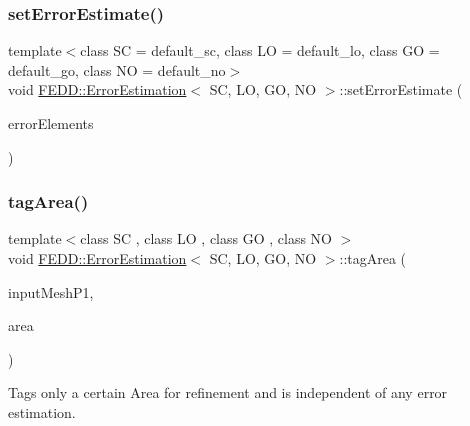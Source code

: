 \subsubsection{\texorpdfstring{set\+Error\+Estimate()}{setErrorEstimate()}}
{\footnotesize\ttfamily template$<$class SC = default\+\_\+sc, class LO = default\+\_\+lo, class GO = default\+\_\+go, class NO = default\+\_\+no$>$ \\
void \hyperlink{classFEDD_1_1ErrorEstimation}{F\+E\+D\+D\+::\+Error\+Estimation}$<$ SC, LO, GO, NO $>$\+::set\+Error\+Estimate (\begin{DoxyParamCaption}\item[{\hyperlink{classFEDD_1_1ErrorEstimation_a5882ff373bf8c409b407b4fd1f42bda0}{Multi\+Vector\+Ptr\+\_\+\+Type}}]{error\+Elements }\end{DoxyParamCaption})\hspace{0.3cm}{\ttfamily [inline]}}

\mbox{\label{classFEDD_1_1ErrorEstimation_a49f28452f08ee5a75220089b1d9c4b61}} 
\subsubsection{\texorpdfstring{tag\+Area()}{tagArea()}}
{\footnotesize\ttfamily template$<$class SC , class LO , class GO , class NO $>$ \\
void \hyperlink{classFEDD_1_1ErrorEstimation}{F\+E\+D\+D\+::\+Error\+Estimation}$<$ SC, LO, GO, NO $>$\+::tag\+Area (\begin{DoxyParamCaption}\item[{\hyperlink{classFEDD_1_1ErrorEstimation_a862043dc355a1524640b5ef53e8eefa1}{Mesh\+Unstr\+Ptr\+\_\+\+Type}}]{input\+Mesh\+P1,  }\item[{vec2\+D\+\_\+dbl\+\_\+\+Type}]{area }\end{DoxyParamCaption})}



Tags only a certain Area for refinement and is independent of any error estimation. 


